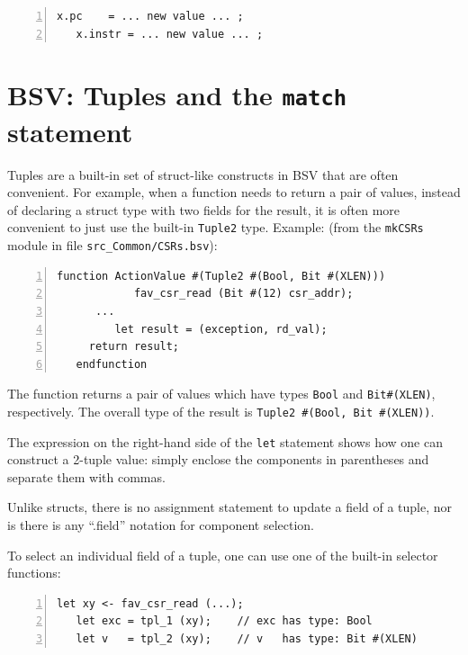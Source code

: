 {\small
\begin{Verbatim}[frame=single, numbers=left]
   x.pc    = ... new value ... ;
   x.instr = ... new value ... ;
\end{Verbatim}
}


\section{BSV: Tuples and the {\tt match} statement}

\label{Sec_Tuples}


Tuples are a built-in set of struct-like constructs in BSV that are
often convenient.  For example, when a function needs to return a pair
of values, instead of declaring a struct type with two fields for the
result, it is often more convenient to just use the built-in
\verb|Tuple2| type.  Example: (from the \verb|mkCSRs| module in file
\verb|src_Common/CSRs.bsv|):

{\small
\begin{Verbatim}[frame=single, numbers=left]
   function ActionValue #(Tuple2 #(Bool, Bit #(XLEN)))
            fav_csr_read (Bit #(12) csr_addr);
      ...
         let result = (exception, rd_val);
	 return result;
   endfunction
\end{Verbatim}
}

The function returns a pair of values which have types \verb|Bool| and
\verb|Bit#(XLEN)|, respectively.  The overall type of the result is
\verb|Tuple2 #(Bool, Bit #(XLEN))|.

The expression on the right-hand side of the \verb|let| statement
shows how one can construct a 2-tuple value: simply enclose the
components in parentheses and separate them with commas.

Unlike structs, there is no assignment statement to update a field of
a tuple, nor is there is any ``.field'' notation for component
selection.

To select an individual field of a tuple, one can use one of the
built-in selector functions:

{\small
\begin{Verbatim}[frame=single, numbers=left]
   let xy <- fav_csr_read (...);
   let exc = tpl_1 (xy);    // exc has type: Bool
   let v   = tpl_2 (xy);    // v   has type: Bit #(XLEN)
\end{Verbatim}
}

